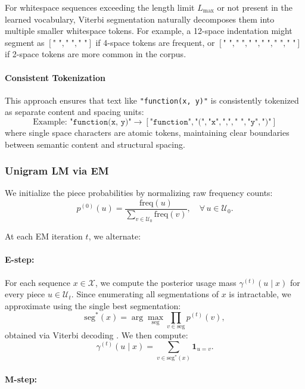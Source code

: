 For whitespace sequences exceeding the length limit $L_{\max}$ or not present in the learned vocabulary, Viterbi segmentation naturally decomposes them into multiple smaller whitespace tokens. For example, a 12-space indentation might segment as $[\texttt{"    "}, \texttt{"    "}, \texttt{"    "}]$ if 4-space tokens are frequent, or $[\texttt{"  "}, \texttt{"  "}, \texttt{"  "}, \texttt{"  "}, \texttt{"  "}, \texttt{"  "}]$ if 2-space tokens are more common in the corpus.

\paragraph{Consistent Tokenization}

This approach ensures that text like \texttt{"function(x, y)"} is consistently tokenized as separate content and spacing units:
\[
\text{Example: } \texttt{"function(x,\ y)"} \rightarrow [\texttt{"function"}, \texttt{"("}, \texttt{"x"}, \texttt{","}, \texttt{" "}, \texttt{"y"}, \texttt{")"}]
\]
where single space characters are atomic tokens, maintaining clear boundaries between semantic content and structural spacing.

\subsubsection{Unigram LM via EM}

We initialize the piece probabilities by normalizing raw frequency counts:
\[
p^{(0)}(u)
= \frac{\mathrm{freq}(u)}{\sum_{v\in\mathcal U_{0}}\mathrm{freq}(v)},
\quad
\forall\,u\in\mathcal U_{0}.
\]

At each EM iteration \(t\), we alternate:

\paragraph{E-step:}

For each sequence \(x\in\mathcal X\), we compute the posterior usage mass \(\gamma^{(t)}(u \mid x)\) for every piece \(u\in \mathcal U_t\). Since enumerating all segmentations of \(x\) is intractable, we approximate using the single best segmentation:
\[
\mathrm{seg}^{*}(x)
= \arg\max_{\mathrm{seg}} \prod_{v\in\mathrm{seg}} p^{(t)}(v),
\]
obtained via Viterbi decoding \cite{kudo2018sentencepiece}. We then compute:
\[
\gamma^{(t)}(u \mid x)
= \sum_{v \in \mathrm{seg}^{*}(x)} \mathbf{1}_{u = v}.
\]

\paragraph{M-step:}

